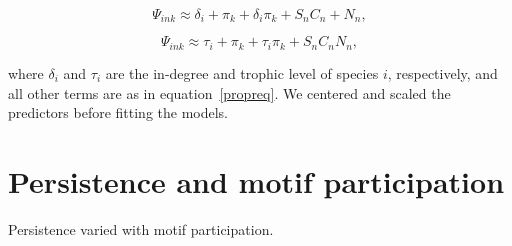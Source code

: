 \documentclass[12pt]{article}
\begin{document}
\begin{spacing}{2.0}
      
            \begin{equation}
                    \Psi_{ink} \approx \delta_{i} + \pi_{k} + \delta_{i}\pi_{k} +
                    S_{n}C_{n} + N_n,
                    \label{degeq}
                \end{equation}
        
            \begin{equation}
                    \Psi_{ink} \approx \tau_{i} + \pi_{k} + \tau_{i}\pi_{k} +
                    S_{n}C_{n} N_n,
                    \label{TLeq}
                \end{equation}
        
            where $\delta_{i}$ and $\tau_i$ are the in-degree and trophic level of species $i$, respectively, and all other terms are as in equation~\ref{propreq}.
            We centered and scaled the predictors before fitting the models.

\clearpage

\section{Persistence and motif participation}

    Persistence varied with motif participation.


\end{spacing}
\end{document}

